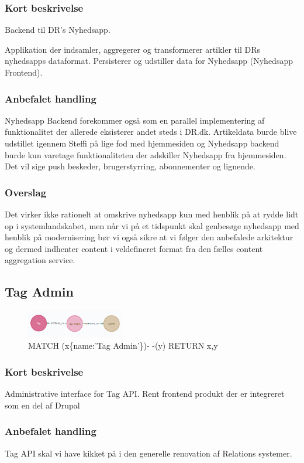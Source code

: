 \documentclass{article}
\begin{document}
\subsubsection{Kort beskrivelse}
Backend til DR's Nyhedsapp.	

Applikation der indsamler, aggregerer og transformerer artikler til DRs nyhedsapps dataformat. Persisterer og udstiller data for Nyhedsapp (Nyhedsapp Frontend).
\subsubsection{Anbefalet handling}
Nyhedsapp Backend forekommer også som en parallel implementering af funktionalitet der allerede eksisterer andet steds i DR.dk. 
Artikeldata burde blive udstillet igennem Steffi på lige fod med hjemmesiden og Nyhedsapp backend burde kun varetage funktionaliteten der adskiller Nyhedsapp fra hjemmesiden. Det vil sige push beskeder, brugerstyrring, abonnementer og lignende. 
\subsubsection{Overslag}
Det virker ikke rationelt at omskrive nyhedsapp kun med henblik på at rydde lidt op i systemlandskabet, men når vi på et tidspunkt skal genbesøge nyhedsapp med henblik på modernisering bør vi også sikre at vi følger den anbefalede arkitektur og dermed indhenter content i veldefineret format fra den fælles content aggregation service.

\subsection{Tag Admin}
\begin{figure}[h]
\includegraphics[width=120pt]{TagAdmin.PNG}
\caption{MATCH (x\{name:'Tag Admin'\})- -(y) RETURN x,y}
\end{figure}
\subsubsection{Kort beskrivelse}
Administrative interface for Tag API.
Rent frontend produkt der er integreret som en del af Drupal
\subsubsection{Anbefalet handling}
Tag API skal vi have kikket på i den generelle renovation af Relations systemer.
\end{document}
